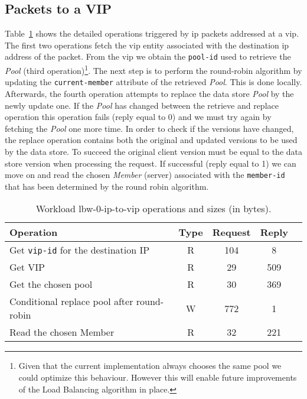 \subsection{Packets to a VIP}
Table~\ref{table:lbw-0-ip-to-vip} shows the detailed operations triggered by \gls{ip}  packets addressed at a \gls{vip}. 
The first two operations fetch the \gls{vip} entity associated with the destination \gls{ip} address of the packet. 
From the \gls{vip} we obtain the \texttt{pool-id} used to retrieve the \emph{Pool} (third operation)\footnote{Given that the current implementation always chooses the same  pool we could optimize this behaviour. However this will enable future improvements of the Load Balancing algorithm in place.}. 
The next step is to perform the round-robin algorithm by updating the \texttt{current-member} attribute of the retrieved \emph{Pool}. 
This is done locally. 
Afterwards, the fourth operation attempts to replace the data store \emph{Pool} by the newly update one. 
If the \emph{Pool} has changed between the retrieve and replace operation this operation fails (reply equal to 0) and we must try again by fetching the \emph{Pool} one more time. In order to check if the versions have changed, the replace operation contains both the original and updated versions to be used by the data store. 
To succeed the original client version must be equal to the data store version when processing the request.
If successful (reply equal to 1) we can move on and read the chosen \emph{Member} (server) associated with the \texttt{member-id}  that has been determined by the round robin algorithm. 

\begin{table}[ht]
\small
\centering 
\begin{tabular}{l c c c c}
 Operation & Type & Request & Reply \\ \toprule 
Get \texttt{vip-id} for the destination IP & R & 104 & 8\\
Get VIP & R & 29 & 509\\
Get the chosen pool & R & 30 & 369\\
Conditional replace pool after round-robin & W & 772 & 1\\
Read the chosen Member & R & 32 & 221 \\ \bottomrule
\end{tabular}\caption[Workload lbw-0-ip-to-vip operations]{Workload lbw-0-ip-to-vip operations
  and sizes (in bytes).}
\label{table:lbw-0-ip-to-vip}
\end{table}


